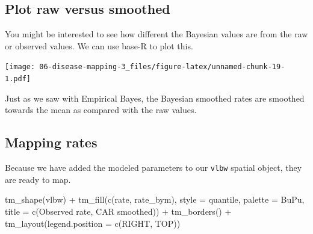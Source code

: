\documentclass[
]{book}
\newenvironment{Shaded}{\begin{snugshade}}{\end{snugshade}}
\newcommand{\AttributeTok}[1]{\textcolor[rgb]{0.77,0.63,0.00}{#1}}
\newcommand{\FunctionTok}[1]{\textcolor[rgb]{0.00,0.00,0.00}{#1}}
\newcommand{\NormalTok}[1]{#1}
\newcommand{\SpecialCharTok}[1]{\textcolor[rgb]{0.00,0.00,0.00}{#1}}
\newcommand{\StringTok}[1]{\textcolor[rgb]{0.31,0.60,0.02}{#1}}
\begin{document}
\hypertarget{plot-raw-versus-smoothed}{%
\subsection{Plot raw versus smoothed}\label{plot-raw-versus-smoothed}}

You might be interested to see how different the Bayesian values are from the raw or observed values. We can use base-R to plot this.

\begin{Shaded}
\end{Shaded}

\texttt{[image: 06-disease-mapping-3\_files/figure-latex/unnamed-chunk-19-1.pdf]}

Just as we saw with Empirical Bayes, the Bayesian smoothed rates are smoothed towards the mean as compared with the raw values.

\hypertarget{mapping-rates}{%
\subsection{Mapping rates}\label{mapping-rates}}

Because we have added the modeled parameters to our \texttt{vlbw} spatial object, they are ready to map.

\begin{Shaded}
\begin{Highlighting}[]
\FunctionTok{tm\_shape}\NormalTok{(vlbw) }\SpecialCharTok{+} 
  \FunctionTok{tm\_fill}\NormalTok{(}\FunctionTok{c}\NormalTok{(}\StringTok{\textquotesingle{}rate\textquotesingle{}}\NormalTok{, }\StringTok{\textquotesingle{}rate\_bym\textquotesingle{}}\NormalTok{),}
          \AttributeTok{style =} \StringTok{\textquotesingle{}quantile\textquotesingle{}}\NormalTok{,}
          \AttributeTok{palette =} \StringTok{\textquotesingle{}BuPu\textquotesingle{}}\NormalTok{,}
          \AttributeTok{title =} \FunctionTok{c}\NormalTok{(}\StringTok{\textquotesingle{}Observed rate\textquotesingle{}}\NormalTok{, }\StringTok{\textquotesingle{}CAR smoothed\textquotesingle{}}\NormalTok{)) }\SpecialCharTok{+}
  \FunctionTok{tm\_borders}\NormalTok{() }\SpecialCharTok{+} 
  \FunctionTok{tm\_layout}\NormalTok{(}\AttributeTok{legend.position =} \FunctionTok{c}\NormalTok{(}\StringTok{\textquotesingle{}RIGHT\textquotesingle{}}\NormalTok{, }\StringTok{\textquotesingle{}TOP\textquotesingle{}}\NormalTok{))}
\end{Highlighting}
\end{Shaded}
\end{document}
